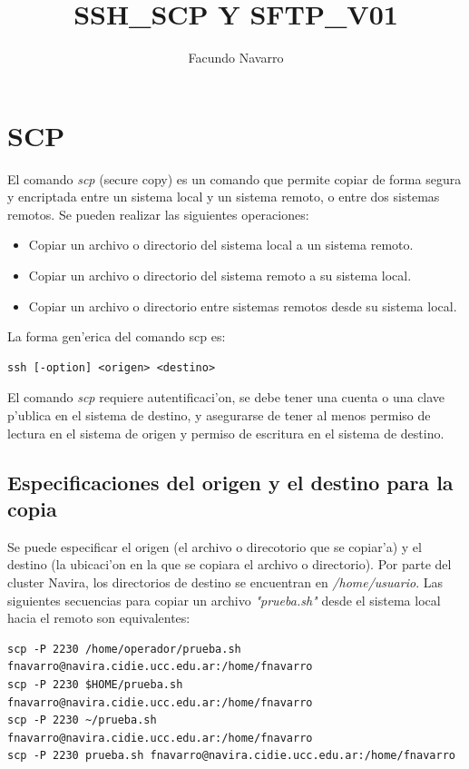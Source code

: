 \documentclass[a4paper]{scrartcl}
\title{SSH\_SCP Y SFTP\_V01}
\author{Facundo Navarro}
\newcommand{\BashFancyFormatLine}{%
  \def\FancyVerbFormatLine##1{\$\,##1}%
}
\begin{document}
\maketitle

\section{SCP}
El comando \textit{scp} (secure copy) es un comando que permite copiar de forma segura y encriptada entre un sistema local y un sistema remoto, o entre dos sistemas remotos. Se pueden realizar las siguientes operaciones:
\begin{itemize}
	\item Copiar un archivo o directorio del sistema local a un sistema remoto.
	\item Copiar un archivo o directorio del sistema remoto a su sistema local.
	\item Copiar un archivo o directorio entre sistemas remotos desde su sistema local. 
\end{itemize}

La forma gen'erica del comando scp es:
\begin{verbatim}
ssh [-option] <origen> <destino>
\end{verbatim}

El comando \textit{scp} requiere autentificaci'on, se debe tener una cuenta o una clave p'ublica en el sistema de destino, y asegurarse de tener al menos permiso de lectura en el sistema de origen y permiso de escritura en el sistema de destino.

\subsection{Especificaciones del origen y el destino para la copia}
Se puede especificar el origen (el archivo o direcotorio que se copiar'a) y el destino (la ubicaci'on en la que se copiara el archivo o directorio). Por parte del cluster Navira, los directorios de destino se encuentran en \textit{/home/usuario}. Las siguientes secuencias para copiar un archivo \textit{"prueba.sh"} desde el sistema local hacia el remoto son equivalentes:

\begin{verbatim}
scp -P 2230 /home/operador/prueba.sh fnavarro@navira.cidie.ucc.edu.ar:/home/fnavarro
scp -P 2230 $HOME/prueba.sh fnavarro@navira.cidie.ucc.edu.ar:/home/fnavarro
scp -P 2230 ~/prueba.sh fnavarro@navira.cidie.ucc.edu.ar:/home/fnavarro
scp -P 2230 prueba.sh fnavarro@navira.cidie.ucc.edu.ar:/home/fnavarro
\end{verbatim}
\end{document}

